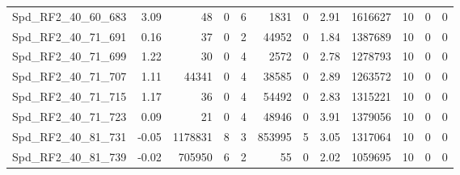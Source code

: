 \begin{longtable}[c]{@{}lrrrrrrrrrrr@{}}
Spd\_RF2\_40\_60\_683         & 3.09                   & 48                      & 0                       & 6                      & 1831                    & 0                       & 2.91                    & 1616627                  & 10                       & 0                        & 0                        \\
Spd\_RF2\_40\_71\_691         & 0.16                   & 37                      & 0                       & 2                      & 44952                   & 0                       & 1.84                    & 1387689                  & 10                       & 0                        & 0                        \\
Spd\_RF2\_40\_71\_699         & 1.22                   & 30                      & 0                       & 4                      & 2572                    & 0                       & 2.78                    & 1278793                  & 10                       & 0                        & 0                        \\
Spd\_RF2\_40\_71\_707         & 1.11                   & 44341                   & 0                       & 4                      & 38585                   & 0                       & 2.89                    & 1263572                  & 10                       & 0                        & 0                        \\
Spd\_RF2\_40\_71\_715         & 1.17                   & 36                      & 0                       & 4                      & 54492                   & 0                       & 2.83                    & 1315221                  & 10                       & 0                        & 0                        \\
Spd\_RF2\_40\_71\_723         & 0.09                   & 21                      & 0                       & 4                      & 48946                   & 0                       & 3.91                    & 1379056                  & 10                       & 0                        & 0                        \\
Spd\_RF2\_40\_81\_731         & -0.05                  & 1178831                 & 8                       & 3                      & 853995                  & 5                       & 3.05                    & 1317064                  & 10                       & 0                        & 0                        \\
Spd\_RF2\_40\_81\_739         & -0.02                  & 705950                  & 6                       & 2                      & 55                      & 0                       & 2.02                    & 1059695                  & 10                       & 0                        & 0                        \\

\end{longtable}
